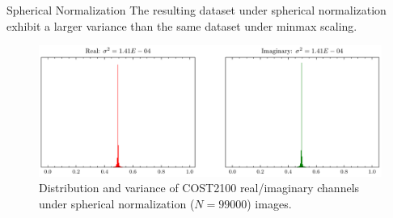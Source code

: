 \documentclass{beamer}
\begin{document}
  \begin{frame}{Spherical Normalization}
    The resulting dataset under spherical normalization exhibit a larger variance than the same dataset under minmax scaling. 
    \begin{figure}[htb]
      \centering
      \includegraphics[width=.9\textwidth]{cost2100_indoor_sph_dist.pdf}
      \caption{Distribution and variance of COST2100 real/imaginary channels under spherical normalization ($N=99000$) images.}
      \label{fig:cost_indoor_sph_dist}
    \end{figure}
  \end{frame}
\end{document}
